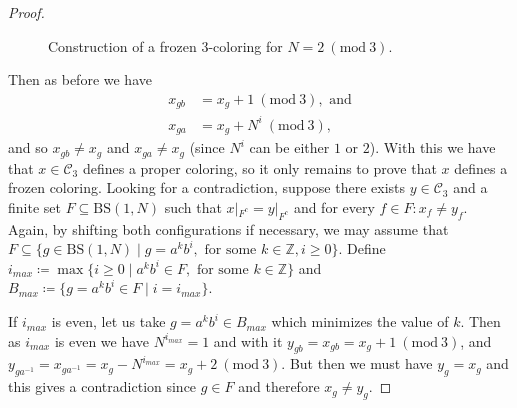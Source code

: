 \documentclass[letterpaper,10pt]{amsart}
\theoremstyle{plain}
\newcommand{\BS}[1][N]{\mathrm{BS}(1,#1)}
\begin{document}
\begin{proof}
\begin{figure}[H]
	\caption{Construction of a frozen $3$-coloring for $N=2\ (\mathrm{mod} \ 3)$.}
	\label{fig:gcs_frozen_3_col_N_2}
	\end{figure}	
	
	Then as before we have
	\begin{align*}
	x_{gb}&=x_g+1 \ (\mathrm{mod} \ 3), \text{ and} \\
	x_{ga}&=x_g+N^i \ (\mathrm{mod} \ 3),
	\end{align*}
	and so $x_{gb}\neq x_g$ and $x_{ga}\neq x_g$ (since $N^i$ can be either $1$ or $2$). With this we have that $x\in \mathcal{C}_3$ defines a proper coloring, so it only remains to prove that $x$ defines a frozen coloring. Looking for a contradiction, suppose there exists $y\in \mathcal{C}_3$ and a finite set $F\subseteq \BS$ such that $x|_{F^c}=y|_{F^c}$ and for every $f\in F: x_f\neq y_f$. Again, by shifting both configurations if necessary, we may assume that $F\subseteq \{g\in \BS\mid g=a^kb^i, \text{ for some }k\in \mathbb{Z}, i\ge 0\}$. Define $i_{max}\coloneqq \max\{ i\ge 0\mid a^kb^i\in F, \text{ for some }k\in \mathbb{Z}\}$ and $B_{max}\coloneqq\{g=a^kb^i\in F\mid i=i_{max}\}$.
	
	If $i_{max}$ is even, let us take $g=a^kb^i\in B_{max}$ which minimizes the value of $k$. Then as $i_{max}$ is even we have $N^{i_{max}}=1$ and with it $y_{gb}=x_{gb}=x_g+1  \ (\mathrm{mod} \ 3)$, and $y_{ga^{-1}}=x_{ga^{-1}}=x_g-N^{i_{max}} = x_g+2  \ (\mathrm{mod} \ 3)$. But then we must have $y_g=x_g$ and this gives a contradiction since $g\in F$ and therefore $x_g\neq y_g$.
	

\end{proof}
\end{document}
